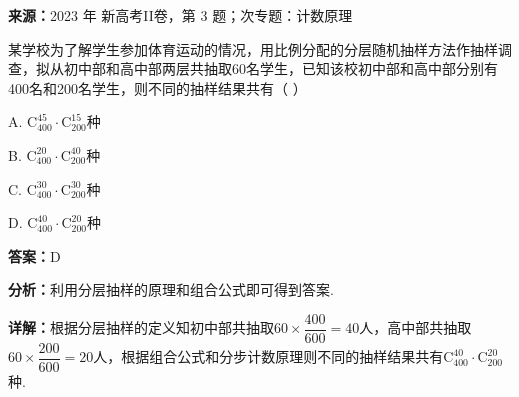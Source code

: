 \begin{question}[points=5]
\textbf{来源：}2023 年 新高考II卷，第 3 题；次专题：计数原理\par
某学校为了解学生参加体育运动的情况，用比例分配的分层随机抽样方法作抽样调查，拟从初中部和高中部两层共抽取60名学生，已知该校初中部和高中部分别有400名和200名学生，则不同的抽样结果共有（ \quad ）
\begin{choices}
  \item A. $\mathrm{C}_{400}^{45}\cdot\mathrm{C}_{200}^{15}$种
  \item B. $\mathrm{C}_{400}^{20}\cdot\mathrm{C}_{200}^{40}$种
  \item C. $\mathrm{C}_{400}^{30}\cdot\mathrm{C}_{200}^{30}$种
  \item D. $\mathrm{C}_{400}^{40}\cdot\mathrm{C}_{200}^{20}$种
\end{choices}
\begin{solution}
\textbf{答案：}D

\textbf{分析：}利用分层抽样的原理和组合公式即可得到答案.

\textbf{详解：}根据分层抽样的定义知初中部共抽取$60\times\dfrac{400}{600}=40$人，高中部共抽取$60\times\dfrac{200}{600}=20$人，根据组合公式和分步计数原理则不同的抽样结果共有$\mathrm{C}_{400}^{40}\cdot\mathrm{C}_{200}^{20}$种.
\end{solution}
\end{question}

